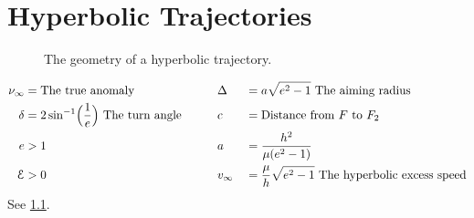 \chapter{Hyperbolic Trajectories}
\label{hyperb-traj}

\begin{figure}
  \centering
  
  \caption[Geometry of a Hyperbola]{The geometry of a hyperbolic trajectory.}
  \label{geometryhyperbola}
\end{figure}
\begin{alignat*}{4} 
  \nu_{\infty} & = \text{The true anomaly} & \qquad & \Delta
  &&{}= a\sqrt{e^2 - 1} \text{ The aiming radius}\\
  \delta & = 2\sin^{-1}\Bigl(\frac{1}{e}\Bigr) \text{ The turn angle} & & c
  &&{}= \text{Distance from } F \text{ to } F_2\\
  e & > 1 & & a &&{}= \frac{h^2}{\mu(e^2 - 1)}\\
  \mathcal{E} & > 0 & & v_{\infty} &&{}= \frac{\mu}{h}\sqrt{e^2 - 1}
  \text{ The hyperbolic excess speed}
\end{alignat*}
See \cref{geometryhyperbola}.
